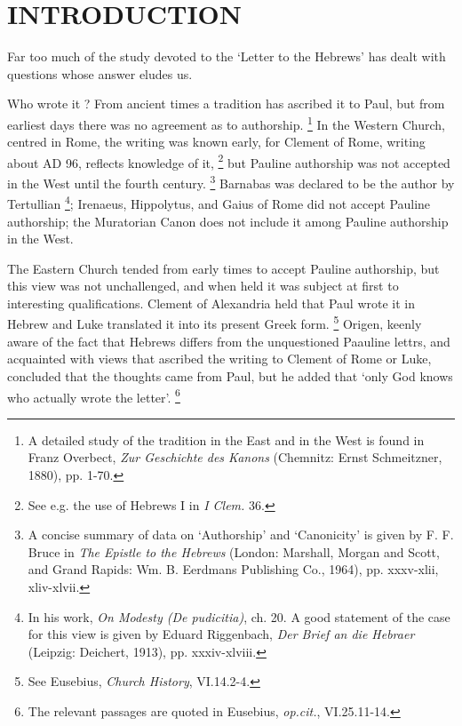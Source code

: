 \chapter{INTRODUCTION}
Far too much of the study devoted to the `Letter to the Hebrews' has dealt with
questions whose answer eludes us.

Who wrote it ?
From ancient times a tradition has ascribed it to Paul, but from earliest days
there was no agreement as to authorship.
\footnote{ A detailed study of the tradition in the East and in the West is
found in Franz Overbect, {\it Zur Geschichte des Kanons} (Chemnitz: Ernst
Schmeitzner, 1880), pp. 1-70.}
In the Western Church, centred in Rome, the writing was known early, for
Clement of Rome, writing about AD 96, reflects knowledge of it,
\footnote{See e.g. the use of Hebrews I in {\it I Clem.} 36.}
but Pauline authorship was not accepted in the West until the fourth century.
\footnote{A concise summary of data on `Authorship' and `Canonicity' is given
by F. F. Bruce in {\it The Epistle to the Hebrews} (London: Marshall, Morgan
and Scott, and Grand Rapids: Wm. B. Eerdmans Publishing Co., 1964),
pp. xxxv-xlii, xliv-xlvii.}
Barnabas was declared to be the author by Tertullian
\footnote{In his work, {\it On Modesty (De pudicitia)}, ch. 20. A good
statement of the case for this view is given by Eduard Riggenbach, {\it Der
Brief an die Hebraer} (Leipzig: Deichert, 1913), pp. xxxiv-xlviii.};
Irenaeus, Hippolytus, and Gaius of Rome did not accept Pauline authorship; the
Muratorian Canon does not include it among Pauline authorship in the West.

The Eastern Church tended from early times to accept Pauline authorship, but
this view was not unchallenged, and when held it was subject at first to
interesting qualifications.
Clement of Alexandria held that Paul wrote it in Hebrew and Luke translated it
into its present Greek form.
\footnote{See Eusebius, {\it Church History}, VI.14.2-4.}
Origen, keenly aware of the fact that Hebrews differs from the unquestioned
Paauline lettrs, and acquainted with views that ascribed the writing to Clement
of Rome or Luke, concluded that the thoughts came from Paul, but he added that
`only God knows who actually wrote the letter'.
\footnote{The relevant passages are quoted in Eusebius, {\it op.cit.},
VI.25.11-14.}

